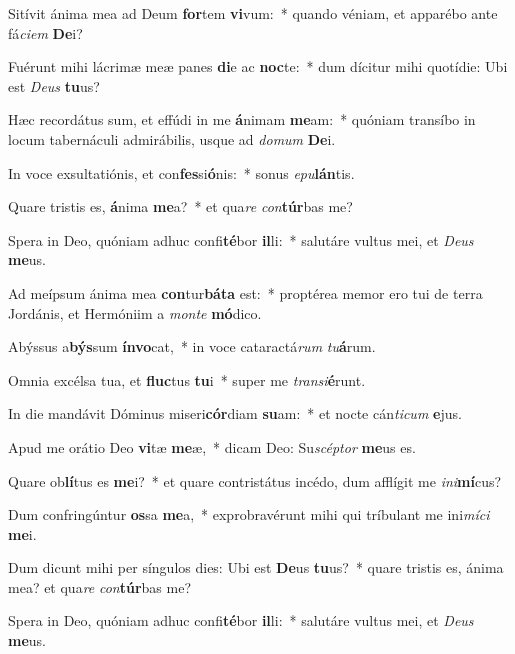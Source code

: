 \item Sitívit ánima mea ad Deum \textbf{for}tem \textbf{vi}vum:~* quando véniam, et apparébo ante fá\textit{ci}\textit{em} \textbf{De}i?
\item Fuérunt mihi lácrimæ meæ panes \textbf{di}e ac \textbf{noc}te:~* dum dícitur mihi quotídie: Ubi est \textit{De}\textit{us} \textbf{tu}us?
\item Hæc recordátus sum, et effúdi in me \textbf{á}nimam \textbf{me}am:~* quóniam transíbo in locum tabernáculi admirábilis, usque ad \textit{do}\textit{mum} \textbf{De}i.
\item In voce exsultatiónis, et con\textbf{fes}si\textbf{ó}nis:~* sonus \textit{e}\textit{pu}\textbf{lán}tis.
\item Quare tristis es, \textbf{á}nima \textbf{me}a?~* et qua\textit{re} \textit{con}\textbf{túr}bas me?
\item Spera in Deo, quóniam adhuc confi\textbf{té}bor \textbf{il}li:~* salutáre vultus mei, et \textit{De}\textit{us} \textbf{me}us.
\item Ad meípsum ánima mea \textbf{con}tur\textbf{bá}\textbf{ta} est:~* proptérea memor ero tui de terra Jordánis, et Hermóniim a \textit{mon}\textit{te} \textbf{mó}dico.
\item Abýssus a\textbf{býs}sum \textbf{ín}\textbf{vo}cat,~* in voce cataractá\textit{rum} \textit{tu}\textbf{á}rum.
\item Omnia excélsa tua, et \textbf{fluc}tus \textbf{tu}i~* super me \textit{trans}\textit{i}\textbf{é}runt.
\item In die mandávit Dóminus miseri\textbf{cór}diam \textbf{su}am:~* et nocte cán\textit{ti}\textit{cum} \textbf{e}jus.
\item Apud me orátio Deo \textbf{vi}tæ \textbf{me}æ,~* dicam Deo: Su\textit{scép}\textit{tor} \textbf{me}us es.
\item Quare ob\textbf{lí}tus es \textbf{me}i?~* et quare contristátus incédo, dum afflígit me \textit{in}\textit{i}\textbf{mí}cus?
\item Dum confringúntur \textbf{os}sa \textbf{me}a,~* exprobravérunt mihi qui tríbulant me ini\textit{mí}\textit{ci} \textbf{me}i.
\item Dum dicunt mihi per síngulos dies: Ubi est \textbf{De}us \textbf{tu}us?~* quare tristis es, ánima mea? et qua\textit{re} \textit{con}\textbf{túr}bas me?
\item Spera in Deo, quóniam adhuc confi\textbf{té}bor \textbf{il}li:~* salutáre vultus mei, et \textit{De}\textit{us} \textbf{me}us.
